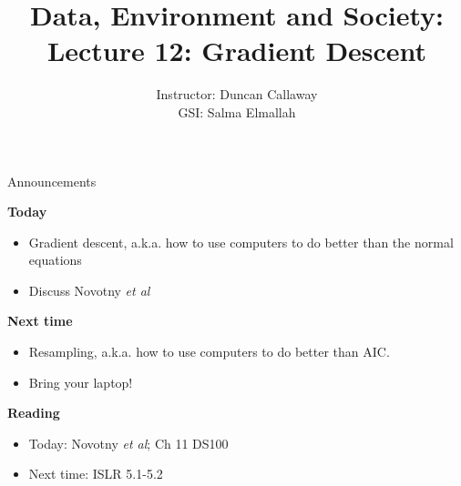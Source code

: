 \documentclass[aspectratio=169]{beamer}
\title[Lecture 12: Gradient Descent] %
{Data, Environment and Society: \\{Lecture 12: Gradient Descent}}
\author[ER131: Data, Environment and Society] 
{Instructor: Duncan Callaway\\
GSI: Salma Elmallah}
\institute[UC Berkeley] %
 {\small{ \bf October 8, 2019}}
\date[October 8, 2019]
\begin{document}
\begin{frame}
  \titlepage
\end{frame}

\begin{frame}{Announcements}

\textbf{Today}
\begin{itemize}
\item Gradient descent, a.k.a. how to use computers to do better than the normal equations
\item Discuss Novotny \textit{et al}
\end{itemize}

\textbf{Next time}
\begin{itemize}
\item Resampling, a.k.a. how to use computers to do better than AIC.
\item Bring your laptop!
\end{itemize}

\textbf{Reading}
\begin{itemize}
\item Today: Novotny \textit{et al}; Ch 11 DS100
\item Next time: ISLR 5.1-5.2
\end{itemize}
\end{frame}
\end{document}
